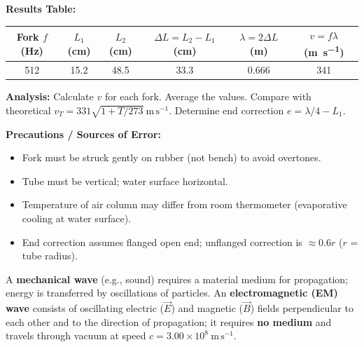 \documentclass[11pt]{article}
\begin{document}
\begin{experience}
\textbf{Results Table:}
\begin{center}
\begin{tabular}{|c|c|c|c|c|c|}\hline
Fork $f$ (\si{Hz}) & $L_1$ (\si{cm}) & $L_2$ (\si{cm}) & $\Delta L = L_2-L_1$ (\si{cm}) & $\lambda = 2\Delta L$ (\si{m}) & $v = f\lambda$ (\si{m.s^{-1}}) \\ \hline
512 & 15.2 & 48.5 & 33.3 & 0.666 & 341 \\ \hline
\end{tabular}
\end{center}

\textbf{Analysis:} Calculate $v$ for each fork. Average the values. Compare with theoretical $v_T = 331\sqrt{1 + T/273}\ \mathrm{m\,s^{-1}}$. Determine end correction $e = \lambda/4 - L_1$.

\textbf{Precautions / Sources of Error:}
\begin{itemize}
\item Fork must be struck gently on rubber (not bench) to avoid overtones.
\item Tube must be vertical; water surface horizontal.
\item Temperature of air column may differ from room thermometer (evaporative cooling at water surface).
\item End correction assumes flanged open end; unflanged correction is $\approx 0.6r$ ($r$ = tube radius).
\end{itemize}
\end{experience}

\begin{definition}
A \textbf{mechanical wave} (e.g., sound) requires a material medium for propagation; energy is transferred by oscillations of particles. An \textbf{electromagnetic (EM) wave} consists of oscillating electric ($\vec{E}$) and magnetic ($\vec{B}$) fields perpendicular to each other and to the direction of propagation; it requires \textbf{no medium} and travels through vacuum at speed $c = 3.00 \times 10^8\ \mathrm{m\,s^{-1}}$.
\end{definition}
\end{document}
